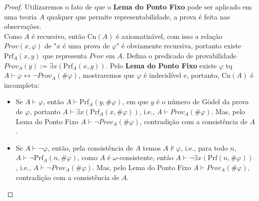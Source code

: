 \documentclass[11pt]{article}
\begin{document}
\begin{proof}
    Utilizaremos o fato de que o \textbf{Lema do Ponto Fixo} pode ser aplicado em uma teoria $A$ qualquer que permite representabilidade, a prova é feita nas observações.\\
    Como $A$ é recursivo, então $\text{Cn}(A)$ é axiomatizável, com isso a relação $Prov(x,\varphi)$ de "$x$ é uma prova de $\varphi$" é obviamente recursiva, portanto existe $\text{Prf}_A(x,y)$ que representa $Prov$ em $A$. Defina o predicado de provabilidade $Prov_A(y):=\exists x(\text{Prf}_A(x,y))$. Pelo \textbf{Lema do Ponto Fixo} existe $\varphi$ tq $A\vdash\varphi\leftrightarrow\neg Prov_A(\#\varphi)$, mostraremos que $\varphi$ é indecidível e, portanto, $\text{Cn}(A)$ é incompleta:
    \begin{itemize}
        \item Se $A\vdash\varphi$, então $A\vdash\text{Prf}_A(y,\#\varphi)$, em que $y$ é o número de Gödel da prova de $\varphi$, portanto $A\vdash\exists x(\text{Prf}_A(x,\#\varphi))$, i.e., $A\vdash Prov_A(\#\varphi)$. Mas, pelo Lema do Ponto Fixo $A\vdash\neg Prov_A(\#\varphi)$, contradição com a consistência de $A$.
        \item Se $A\vdash\neg\varphi$, então, pela consistência de $A$ temos $A\nvdash\varphi$, i.e., para todo $n$, $A\vdash\neg \text{Prf}_A(n,\#\varphi)$, como $A$ é $\omega$-consistente, então $A\vdash\neg\exists x(\text{Prf}(n,\#\varphi))$, i.e., $A\vdash\neg Prov_A(\#\varphi)$. Mas, pelo Lema do Ponto Fixo $A\vdash Prov_A(\#\varphi)$, contradição com a consistência de $A$.
    \end{itemize}
\end{proof}
\end{document}
